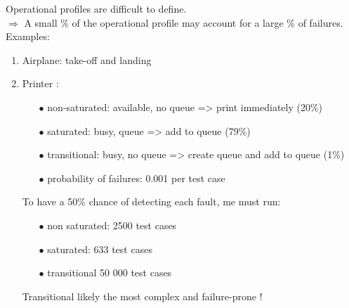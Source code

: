 \documentclass{article}
\begin{document}
\noindent Operational profiles are difficult to define.\\
$\Rightarrow$ A small \% of the operational profile may account for a large \% of failures.
\noindent Examples:
\begin{enumerate}
    \item Airplane: take-off and landing
    \item Printer : 
    \begin{itemize}
        \item [$\bullet$]non-saturated: available, no queue => print immediately (20\%)
        \item [$\bullet$]saturated: busy, queue => add to queue (79\%)

        \item [$\bullet$]transitional: busy, no queue => create queue and add to queue (1\%)
        \item [$\bullet$]probability of failures: 0.001 per test case
    \end{itemize}
    To have a 50\% chance of detecting each fault, me must run:
    \begin{itemize}
        \item [$\bullet$]non saturated: 2500 test cases
        \item [$\bullet$]saturated: 633 test cases
        \item [$\bullet$]transitional 50 000 test cases
    \end{itemize}
    Transitional likely the most complex and failure-prone !

\end{enumerate}
\end{document}
